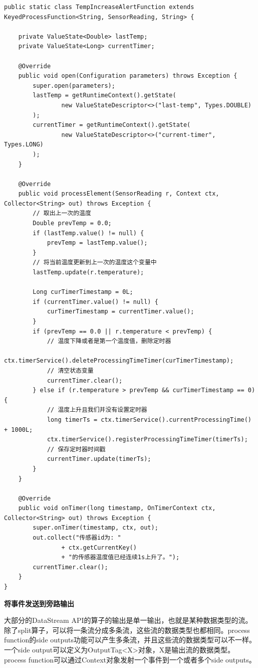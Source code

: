 \documentclass[cn,11pt,chinese]{elegantbook}
\begin{document}
\begin{verbatim}
public static class TempIncreaseAlertFunction extends KeyedProcessFunction<String, SensorReading, String> {

    private ValueState<Double> lastTemp;
    private ValueState<Long> currentTimer;

    @Override
    public void open(Configuration parameters) throws Exception {
        super.open(parameters);
        lastTemp = getRuntimeContext().getState(
                new ValueStateDescriptor<>("last-temp", Types.DOUBLE)
        );
        currentTimer = getRuntimeContext().getState(
                new ValueStateDescriptor<>("current-timer", Types.LONG)
        );
    }

    @Override
    public void processElement(SensorReading r, Context ctx, Collector<String> out) throws Exception {
        // 取出上一次的温度
        Double prevTemp = 0.0;
        if (lastTemp.value() != null) {
            prevTemp = lastTemp.value();
        }
        // 将当前温度更新到上一次的温度这个变量中
        lastTemp.update(r.temperature);

        Long curTimerTimestamp = 0L;
        if (currentTimer.value() != null) {
            curTimerTimestamp = currentTimer.value();
        }
        if (prevTemp == 0.0 || r.temperature < prevTemp) {
            // 温度下降或者是第一个温度值，删除定时器
            ctx.timerService().deleteProcessingTimeTimer(curTimerTimestamp);
            // 清空状态变量
            currentTimer.clear();
        } else if (r.temperature > prevTemp && curTimerTimestamp == 0) {
            // 温度上升且我们并没有设置定时器
            long timerTs = ctx.timerService().currentProcessingTime() + 1000L;
            ctx.timerService().registerProcessingTimeTimer(timerTs);
            // 保存定时器时间戳
            currentTimer.update(timerTs);
        }
    }

    @Override
    public void onTimer(long timestamp, OnTimerContext ctx, Collector<String> out) throws Exception {
        super.onTimer(timestamp, ctx, out);
        out.collect("传感器id为: "
                + ctx.getCurrentKey()
                + "的传感器温度值已经连续1s上升了。");
        currentTimer.clear();
    }
}
\end{verbatim}

\textbf{将事件发送到旁路输出}

大部分的DataStream API的算子的输出是单一输出，也就是某种数据类型的流。除了split算子，可以将一条流分成多条流，这些流的数据类型也都相同。process function的side outputs功能可以产生多条流，并且这些流的数据类型可以不一样。一个side output可以定义为OutputTag<X>对象，X是输出流的数据类型。process function可以通过Context对象发射一个事件到一个或者多个side outputs。
\end{document}
